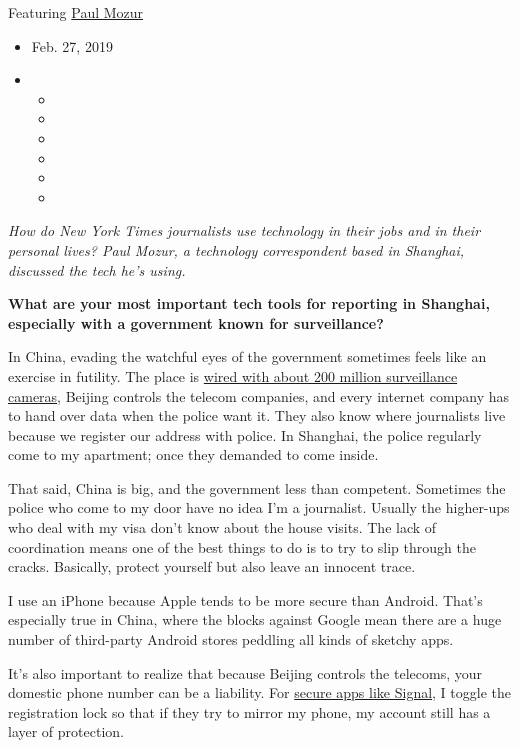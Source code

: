 Featuring \href{https://www.nytimes.com/by/paul-mozur}{Paul Mozur}

\begin{itemize}
\item
  Feb. 27, 2019
\item
  \begin{itemize}
  \item
  \item
  \item
  \item
  \item
  \item
  \end{itemize}
\end{itemize}

\emph{How do New York Times journalists use technology in their jobs and
in their personal lives? Paul Mozur, a technology correspondent based in
Shanghai, discussed the tech he's using.}

\textbf{What are your most important tech tools for reporting in
Shanghai, especially with a government known for surveillance?}

In China, evading the watchful eyes of the government sometimes feels
like an exercise in futility. The place is
\href{https://www.nytimes.com/2018/07/08/business/china-surveillance-technology.html}{wired
with about 200 million surveillance cameras}, Beijing controls the
telecom companies, and every internet company has to hand over data when
the police want it. They also know where journalists live because we
register our address with police. In Shanghai, the police regularly come
to my apartment; once they demanded to come inside.

That said, China is big, and the government less than competent.
Sometimes the police who come to my door have no idea I'm a journalist.
Usually the higher-ups who deal with my visa don't know about the house
visits. The lack of coordination means one of the best things to do is
to try to slip through the cracks. Basically, protect yourself but also
leave an innocent trace.

I use an iPhone because Apple tends to be more secure than Android.
That's especially true in China, where the blocks against Google mean
there are a huge number of third-party Android stores peddling all kinds
of sketchy apps.

It's also important to realize that because Beijing controls the
telecoms, your domestic phone number can be a liability. For
\href{https://www.nytimes.com/2016/12/07/technology/personaltech/worried-about-the-privacy-of-your-messages-download-signal.html}{secure
apps like Signal}, I toggle the registration lock so that if they try to
mirror my phone, my account still has a layer of protection.

